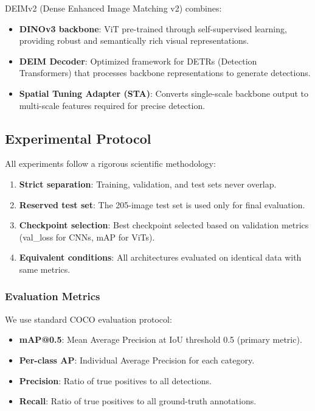 \documentclass[journal,twoside,web]{ieeecolor}
\begin{document}
DEIMv2 (Dense Enhanced Image Matching v2) combines:
\begin{itemize}
    \item \textbf{DINOv3 backbone}: ViT pre-trained through self-supervised learning, providing robust and semantically rich visual representations.
    \item \textbf{DEIM Decoder}: Optimized framework for DETRs (Detection Transformers) that processes backbone representations to generate detections.
    \item \textbf{Spatial Tuning Adapter (STA)}: Converts single-scale backbone output to multi-scale features required for precise detection.
\end{itemize}

\subsection{Experimental Protocol}

All experiments follow a rigorous scientific methodology:

\begin{enumerate}
    \item \textbf{Strict separation}: Training, validation, and test sets never overlap.
    \item \textbf{Reserved test set}: The 205-image test set is used only for final evaluation.
    \item \textbf{Checkpoint selection}: Best checkpoint selected based on validation metrics (val\_loss for CNNs, mAP for ViTs).
    \item \textbf{Equivalent conditions}: All architectures evaluated on identical data with same metrics.
\end{enumerate}

\subsubsection{Evaluation Metrics}

We use standard COCO evaluation protocol:
\begin{itemize}
    \item \textbf{mAP@0.5}: Mean Average Precision at IoU threshold 0.5 (primary metric).
    \item \textbf{Per-class AP}: Individual Average Precision for each category.
    \item \textbf{Precision}: Ratio of true positives to all detections.
    \item \textbf{Recall}: Ratio of true positives to all ground-truth annotations.
\end{itemize}
\end{document}
